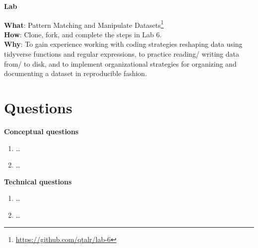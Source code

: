 \documentclass[
  letterpaper,
  DIV=11,
  numbers=noendperiod]{scrreport}
\providecommand{\tightlist}{%
  \setlength{\itemsep}{0pt}\setlength{\parskip}{0pt}}\usepackage{longtable,booktabs,array}
\theoremstyle{definition}
\theoremstyle{remark}
\DeclareRobustCommand{\href}[2]{#2\footnote{\url{#1}}}
\begin{document}
\begin{tcolorbox}[enhanced jigsaw, leftrule=.75mm, bottomrule=.15mm, opacityback=0, breakable, left=2mm, colback=white, toprule=.15mm, arc=.35mm, rightrule=.15mm]

\textbf{ Lab}

\textbf{What}: \href{https://github.com/qtalr/lab-6}{Pattern Matching
and Manipulate Datasets}\\
\textbf{How}: Clone, fork, and complete the steps in Lab 6.\\
\textbf{Why}: To gain experience working with coding strategies
reshaping data using tidyverse functions and regular expressions, to
practice reading/ writing data from/ to disk, and to implement
organizational strategies for organizing and documenting a dataset in
reproducible fashion.

\end{tcolorbox}

\hypertarget{questions-5}{%
\section*{Questions}\label{questions-5}}


\begin{tcolorbox}[enhanced jigsaw, leftrule=.75mm, bottomrule=.15mm, opacityback=0, breakable, left=2mm, colback=white, toprule=.15mm, arc=.35mm, rightrule=.15mm]

 \textbf{Conceptual questions}

\begin{enumerate}
\def\labelenumi{\arabic{enumi}.}
\tightlist
\item
  \ldots{}
\item
  \ldots{}
\end{enumerate}

\end{tcolorbox}

\begin{tcolorbox}[enhanced jigsaw, leftrule=.75mm, bottomrule=.15mm, opacityback=0, breakable, left=2mm, colback=white, toprule=.15mm, arc=.35mm, rightrule=.15mm]

 \textbf{Technical questions}

\begin{enumerate}
\def\labelenumi{\arabic{enumi}.}
\tightlist
\item
  \ldots{}
\item
  \ldots{}
\end{enumerate}

\end{tcolorbox}
\end{document}
